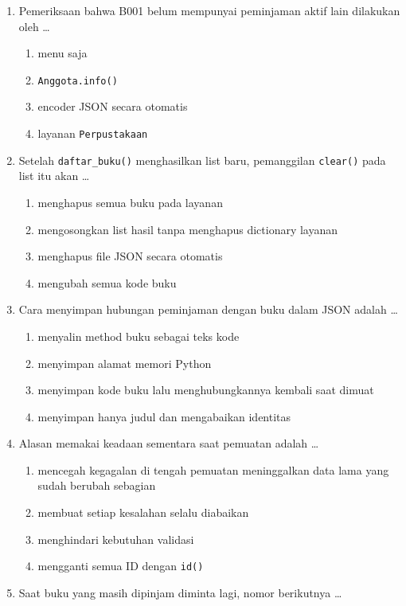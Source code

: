 \begin{enumerate}
  \item Pemeriksaan bahwa B001 belum mempunyai peminjaman aktif lain dilakukan oleh \ldots
  \begin{enumerate}[label=\alph*.,itemsep=0pt]
    \item menu saja
    \item \texttt{Anggota.info()}
    \item encoder JSON secara otomatis
    \item layanan \texttt{Perpustakaan}
  \end{enumerate}
  \item Setelah \texttt{daftar\_buku()} menghasilkan list baru, pemanggilan \texttt{clear()} pada list itu akan \ldots
  \begin{enumerate}[label=\alph*.,itemsep=0pt]
    \item menghapus semua buku pada layanan
    \item mengosongkan list hasil tanpa menghapus dictionary layanan
    \item menghapus file JSON secara otomatis
    \item mengubah semua kode buku
  \end{enumerate}
  \item Cara menyimpan hubungan peminjaman dengan buku dalam JSON adalah \ldots
  \begin{enumerate}[label=\alph*.,itemsep=0pt]
    \item menyalin method buku sebagai teks kode
    \item menyimpan alamat memori Python
    \item menyimpan kode buku lalu menghubungkannya kembali saat dimuat
    \item menyimpan hanya judul dan mengabaikan identitas
  \end{enumerate}
  \item Alasan memakai keadaan sementara saat pemuatan adalah \ldots
  \begin{enumerate}[label=\alph*.,itemsep=0pt]
    \item mencegah kegagalan di tengah pemuatan meninggalkan data lama yang sudah berubah sebagian
    \item membuat setiap kesalahan selalu diabaikan
    \item menghindari kebutuhan validasi
    \item mengganti semua ID dengan \texttt{id()}
  \end{enumerate}
  \item Saat buku yang masih dipinjam diminta lagi, nomor berikutnya \ldots

\end{enumerate}
